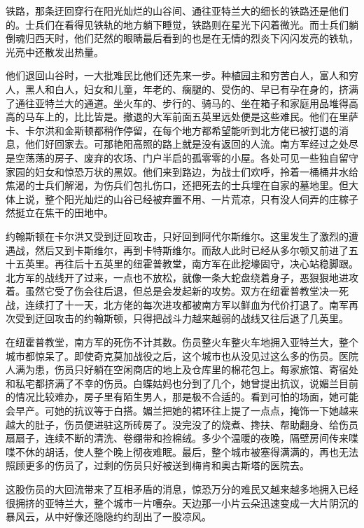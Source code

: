 \par 铁路，那条迂回穿行在阳光灿烂的山谷间、通往亚特兰大的细长的铁路还是他们的。士兵们在看得见铁轨的地方躺下睡觉，铁路则在星光下闪着微光。而士兵们躺倒魂归西天时，他们茫然的眼睛最后看到的也是在无情的烈炎下闪闪发亮的铁轨，光亮中还散发出热量。
\par 他们退回山谷时，一大批难民比他们还先来一步。种植园主和穷苦白人，富人和穷人，黑人和白人，妇女和儿童，年老的、瘸腿的、受伤的、早已有孕在身的，挤满了通往亚特兰大的通道。坐火车的、步行的、骑马的、坐在箱子和家庭用品堆得高高的马车上的，比比皆是。撤退的大军前面五英里远处便是这些难民。他们在里萨卡、卡尔洪和金斯顿都稍作停留，在每个地方都希望能听到北方佬已被打退的消息，他们好回家去。可那艳阳高照的路上就是没有返回的人流。南方军经过之处尽是空荡荡的房子、废弃的农场、门户半启的孤零零的小屋。各处可见一些独自留守家园的妇女和惊恐万状的黑奴。他们来到路边，为战士们欢呼，拎着一桶桶井水给焦渴的士兵们解渴，为伤兵们包扎伤口，还把死去的士兵埋在自家的墓地里。但大体上说，整个阳光灿烂的山谷已经被弃置不用、一片荒凉，只有没人伺弄的庄稼孑然挺立在焦干的田地中。
\par 约翰斯顿在卡尔洪又受到迂回攻击，只好回到阿代尔斯维尔。这里发生了激烈的遭遇战，然后又到卡斯维尔，再到卡特斯维尔。而敌人此时已经从多尔顿又前进了五十五英里。再往后十五英里的纽霍普教堂，南方军在此挖壕固守，决心站稳脚跟。北方军的战线开了过来，一点也不放松，就像一条大蛇盘绕着身子，恶狠狠地进攻着。虽然它受了伤会往后退，但总是会发起新的攻势。双方在纽霍普教堂决一死战，连续打了十一天，北方佬的每次进攻都被南方军以鲜血为代价打退了。南军再次受到迂回攻击的约翰斯顿，只得把战斗力越来越弱的战线又往后退了几英里。
\par 在纽霍普教堂，南方军的死伤不计其数。伤员整火车整火车地拥入亚特兰大，整个城市都惊呆了。即使奇克莫加战役之后，这个城市也从没见过这么多的伤员。医院人满为患，伤员只好躺在空闲商店的地上及仓库里的棉花包上。每家旅馆、寄宿处和私宅都挤满了不幸的伤员。白蝶姑妈也分到了几个，她曾提出抗议，说媚兰目前的情况比较难办，房子里有陌生男人，那是极不合适的。看到可怕的场面，她可能会早产。可她的抗议等于白搭。媚兰把她的裙环往上提了一点点，掩饰一下她越来越大的肚子，伤员便进驻这所砖房了。没完没了的烧煮、搀扶、帮助翻身、给伤员扇扇子，连续不断的清洗、卷绷带和捡棉绒。多少个温暖的夜晚，隔壁房间传来喋喋不休的胡话，使人整个晚上彻夜难眠。最后，整个城市被塞得满满的，再也无法照顾更多的伤员了，过剩的伤员只好被送到梅肯和奥古斯塔的医院去。
\par 这股伤员的大回流带来了互相矛盾的消息，惊恐万分的难民又越来越多地拥入已经很拥挤的亚特兰大，整个城市一片嘈杂。天边那一小片云朵迅速变成一大片阴沉的暴风云，从中好像还隐隐约约刮出了一股凉风。
